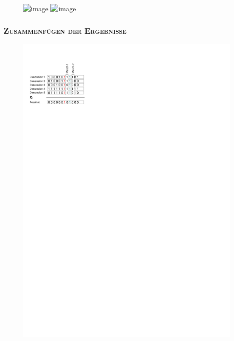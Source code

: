 \documentclass[xcolor=x11names,compress]{beamer}
\renewcommand{\(}{\begin{columns}}
\renewcommand{\)}{\end{columns}}
\newcommand{\<}[1]{\begin{column}{#1}}
\renewcommand{\>}{\end{column}}
\begin{document}
\begin{frame}
  \begin{figure}
  \hspace*{-4cm}
  \centering
  \includegraphics<1>[height=0.9\textheight]{figures/bitvector-L1-7_9_11_13_15}
  \includegraphics<2>[height=0.9\textheight]{figures/bitvector-L1-7_9_12_14_16}
  \end{figure}
\end{frame}

\begin{frame}
  \frametitle{\scshape Zusammenfügen der Ergebnisse}
  \begin{figure}
  \centering
  \includegraphics[height=0.7\textheight]{figures/matching} %
  \end{figure}
\end{frame}
\end{document}
